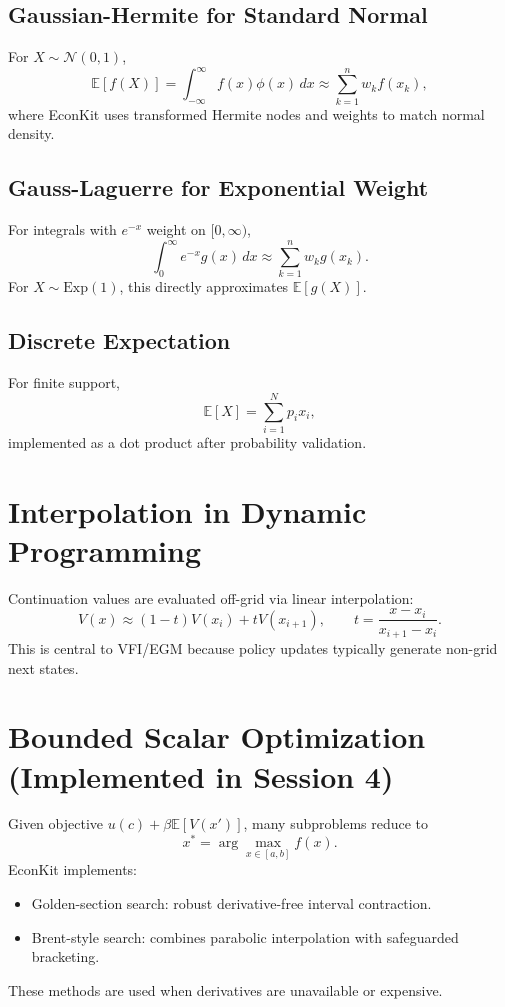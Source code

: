 \documentclass[11pt]{article}
\begin{document}
\subsection{Gaussian-Hermite for Standard Normal}
For \(X \sim \mathcal{N}(0,1)\),
\begin{equation}
    \mathbb{E}[f(X)] = \int_{-\infty}^{\infty} f(x)\phi(x)\,dx
    \approx \sum_{k=1}^n w_k f(x_k),
\end{equation}
where EconKit uses transformed Hermite nodes and weights to match normal density.

\subsection{Gauss-Laguerre for Exponential Weight}
For integrals with \(e^{-x}\) weight on \([0,\infty)\),
\begin{equation}
    \int_0^{\infty} e^{-x} g(x)\,dx \approx \sum_{k=1}^n w_k g(x_k).
\end{equation}
For \(X\sim \text{Exp}(1)\), this directly approximates \(\mathbb{E}[g(X)]\).

\subsection{Discrete Expectation}
For finite support,
\begin{equation}
    \mathbb{E}[X] = \sum_{i=1}^N p_i x_i,
\end{equation}
implemented as a dot product after probability validation.

\section{Interpolation in Dynamic Programming}
Continuation values are evaluated off-grid via linear interpolation:
\begin{equation}
    V(x) \approx (1-t) V(x_i) + t V(x_{i+1}), \qquad
    t = \frac{x-x_i}{x_{i+1}-x_i}.
\end{equation}
This is central to VFI/EGM because policy updates typically generate non-grid next states.

\section{Bounded Scalar Optimization (Implemented in Session 4)}
Given objective \(u(c) + \beta \mathbb{E}[V(x')]\), many subproblems reduce to
\begin{equation}
    x^* = \arg\max_{x\in[a,b]} f(x).
\end{equation}
EconKit implements:
\begin{itemize}
    \item Golden-section search: robust derivative-free interval contraction.
    \item Brent-style search: combines parabolic interpolation with safeguarded bracketing.
\end{itemize}
These methods are used when derivatives are unavailable or expensive.
\end{document}
